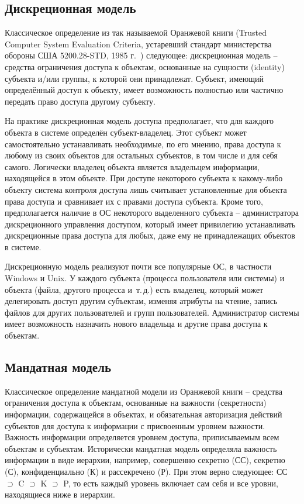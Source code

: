 \subsection{Дискреционная модель}

Классическое определение из так называемой Оранжевой книги (Trusted Computer System Evaluation Criteria, устаревший стандарт министерства обороны США 5200.28-STD, 1985 г.~\cite{DOD-5200.28-STD}) следующее: дискреционная модель -- средства ограничения доступа к объектам, основанные на сущности (identity) субъекта и/или группы, к которой они принадлежат. Субъект, имеющий определённый доступ к объекту, имеет возможность полностью или частично передать право доступа другому субъекту.

На практике дискреционная модель доступа предполагает, что для каждого объекта в системе определён субъект-владелец. Этот субъект может самостоятельно устанавливать необходимые, по его мнению, права доступа к любому из своих объектов для остальных субъектов, в том числе и для себя самого. Логически владелец объекта является владельцем информации, находящейся в этом объекте. При доступе некоторого субъекта к какому-либо объекту система контроля доступа лишь считывает установленные для объекта права доступа и сравнивает их с правами доступа субъекта. Кроме того, предполагается наличие в ОС некоторого выделенного субъекта -- администратора дискреционного управления доступом, который имеет привилегию устанавливать дискреционные права доступа для любых, даже ему не принадлежащих объектов в системе.

Дискреционную модель реализуют почти все популярные ОС, в частности Windows и Unix. У каждого субъекта (процесса пользователя или системы) и объекта (файла, другого процесса и~т.\,д.) есть владелец, который может делегировать доступ другим субъектам, изменяя атрибуты на чтение, запись файлов для других пользователей и групп пользователей. Администратор системы имеет возможность назначить нового владельца и другие права доступа к объектам.


\subsection{Мандатная модель}

Классическое определение мандатной модели из Оранжевой книги -- средства ограничения доступа к объектам, основанные на важности (секретности) информации, содержащейся в объектах, и обязательная авторизация действий субъектов для доступа к информации с присвоенным уровнем важности. Важность информации определяется уровнем доступа, приписываемым всем объектам и субъектам. Исторически мандатная модель определяла важность информации в виде иерархии, например, совершенно секретно (СС), секретно (С), конфиденциально (К) и рассекречено (Р). При этом верно следующее: СС $\supset$ C $\supset$ K $\supset$ P, то есть каждый уровень включает сам себя и все уровни, находящиеся ниже в иерархии.

